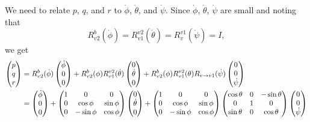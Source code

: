 {We need to relate $p$, $q$, and $r$ to $\dot{\phi}$, $\dot{\theta}$,
and $\dot{\psi}$.  Since $\dot{\phi}$, $\dot{\theta}$, $\dot{\psi}$
are small and noting that
\[
R_{v2}^{b}(\dot{\phi}) = R_{v1}^{v2}(\dot{\theta}) =
R_{v}^{v1}(\dot{\psi}) = I,
\]
we get
\begin{align}
\begin{pmatrix} p \\ q \\ r \end{pmatrix} &=
R_{v2}^{b}(\dot{\phi}) \begin{pmatrix} \dot{\phi} \\ 0 \\ 0
\end{pmatrix}
+ R_{v2}^{b}(\phi)R_{v1}^{v2}(\dot{\theta}) \begin{pmatrix} 0 \\ \dot{\theta} \\
0 \end{pmatrix} + R_{v2}^{b}(\phi) R_{v1}^{v2}(\theta) R_{v\to
v1}(\dot{\psi})
    \begin{pmatrix} 0 \\ 0 \\ \dot{\psi} \end{pmatrix}  \notag \\
&= \begin{pmatrix} \dot{\phi} \\ 0 \\ 0 \end{pmatrix} +
\begin{pmatrix}
    1 & 0 & 0 \\
    0 & \cos\phi & \sin\phi \\
    0 & -\sin\phi & \cos\phi
  \end{pmatrix}
  \begin{pmatrix} 0 \\ \dot{\theta} \\ 0 \end{pmatrix}
+ \begin{pmatrix}
    1 & 0 & 0 \\
    0 & \cos\phi & \sin\phi \\
    0 & -\sin\phi & \cos\phi
  \end{pmatrix}
  \begin{pmatrix}
    \cos\theta & 0 & -\sin\theta \\
    0 & 1 & 0 \\
    \sin\theta & 0 & \cos\theta
  \end{pmatrix}
  \begin{pmatrix} 0 \\ 0 \\ \dot{\psi} \end{pmatrix}  \notag \\

\end{align}}
